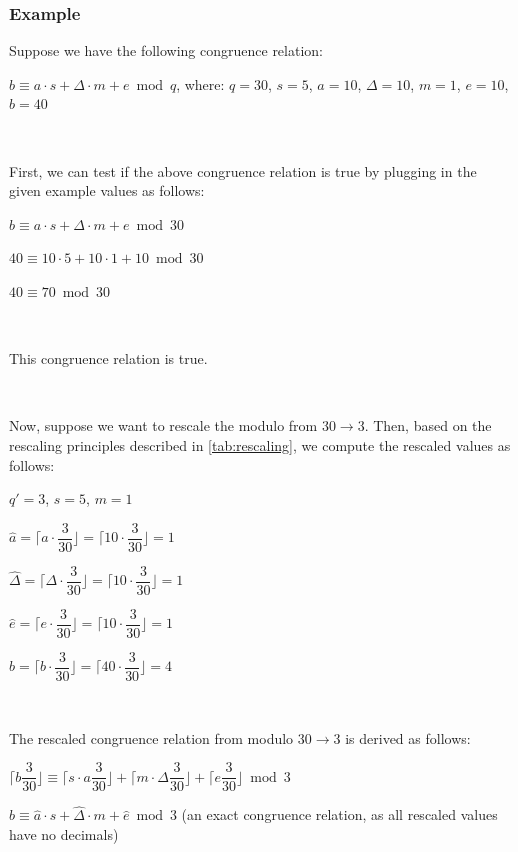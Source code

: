 \subsubsection{Example}
\label{subsec:modulo-rescaling-ex}

Suppose we have the following congruence relation:

$b \equiv a\cdot s + \Delta \cdot m + e \bmod q$, \text{ } where: $q = 30$, \text{ } $s = 5$, \text{ } $a = 10$, \text{ } $\Delta = 10$, \text{ } $m = 1$, \text{ } $e = 10$, \text{ } $b = 40$

$ $

First, we can test if the above congruence relation is true by plugging in the given example values as follows: 

$b \equiv a\cdot s + \Delta \cdot m + e \bmod 30$

$40 \equiv 10 \cdot 5 + 10 \cdot 1 + 10 \bmod 30$

$40 \equiv 70 \bmod 30$ 

$ $

This congruence relation is true. 

$ $

Now, suppose we want to rescale the modulo from $30 \rightarrow 3$. Then, based on the rescaling principles described in \autoref{tab:rescaling}, we compute the rescaled values as follows: 

$q'= 3$, \text{ } $s = 5$, \text{ } $m = 1$

$\hat{a} = \Bigg\lceil a\cdot\dfrac{3}{30} \Bigg\rfloor = \Bigg\lceil 10\cdot\dfrac{3}{30} \Bigg\rfloor = 1$

$\hat{\Delta} = \Bigg\lceil \Delta\cdot\dfrac{3}{30} \Bigg\rfloor = \Bigg\lceil 10\cdot\dfrac{3}{30} \Bigg\rfloor = 1$



$\hat{e} = \Bigg\lceil e\cdot\dfrac{3}{30} \Bigg\rfloor = \Bigg\lceil 10\cdot\dfrac{3}{30} \Bigg\rfloor = 1$

$\hat{b} = \Bigg\lceil b\cdot\dfrac{3}{30} \Bigg\rfloor = \Bigg\lceil 40\cdot\dfrac{3}{30} \Bigg\rfloor = 4$

$ $

The rescaled congruence relation from modulo $30 \rightarrow 3$ is derived as follows:

$\Bigg\lceil b\dfrac{3}{30} \Bigg\rfloor \equiv \Bigg\lceil s\cdot a \dfrac{3}{30} \Bigg\rfloor + \Bigg\lceil m \cdot \Delta \dfrac{3}{30} \Bigg\rfloor + \Bigg\lceil e \dfrac{3}{30} \Bigg\rfloor \bmod 3$

$\hat{b} \equiv \hat{a} \cdot s + \hat{\Delta} \cdot m + \hat{e}  \bmod 3$
 \text{ } (an exact congruence relation, as all rescaled values have no decimals)

